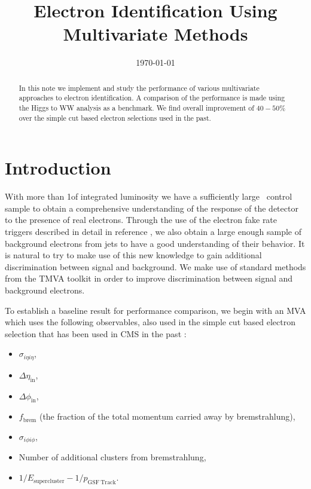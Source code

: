 \documentclass{cmspaper}
\begin{document}
\begin{titlepage}


  \date{\today}

  \title{Electron Identification Using Multivariate Methods }

  

  \begin{abstract}
    In this note we implement and study the performance of various multivariate approaches to 
electron identification. A comparison of the performance is made using the Higgs to WW analysis 
as a benchmark. We find overall improvement of $40-50\%$ over the simple cut based electron 
selections used in the past. 
  \end{abstract} 

\end{titlepage}
\tableofcontents
\newpage 

\section{Introduction}
  \label{sec:introduction}
With more than 1\ifb of integrated luminosity we have a sufficiently large \zee\ control sample to obtain a comprehensive understanding of the response of the detector to the presence of real electrons. Through the use of the electron fake rate triggers described in detail in reference \cite{hww_eps}, we also obtain a large enough sample of background electrons from jets to have a good understanding of their behavior. It is natural to try to make use of this new knowledge to gain additional discrimination between signal and background. We make use of standard methods from the TMVA toolkit \cite{tmva} in order to improve discrimination between signal and background electrons. 

To establish a baseline result for performance comparison, we begin with an MVA which uses the following observables, also used in the simple cut based electron selection that has been used in CMS in the past \cite{hww_eps,VBTFCrossSectionNote,ElectronID} :

\begin{itemize}
    \item $\sigma_{i\eta i\eta}$,
    \item $\Delta \eta_{\mathrm{in}}$, 
    \item $\Delta \phi_{\mathrm{in}}$,
    \item $f_{\mathrm{brem}}$ (the fraction of the total momentum carried away by bremstrahlung),
    \item $\sigma_{i\phi i\phi}$,
    \item Number of additional clusters from bremstrahlung,
    \item $1/E_{\mathrm{supercluster}} - 1/p_{\mathrm{GSF\ Track}}$.
\end{itemize}
\end{document}
